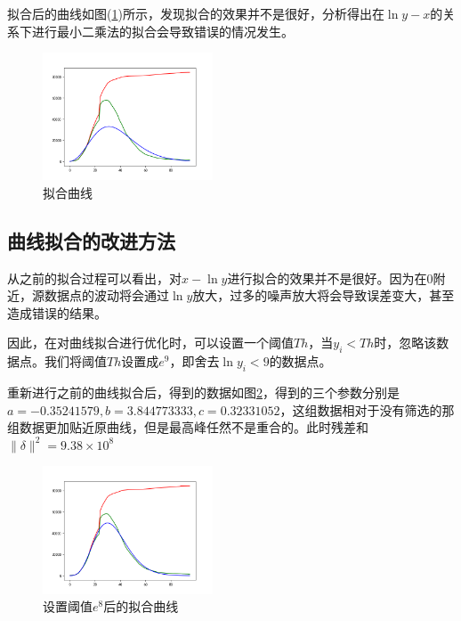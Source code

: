 \documentclass{article}
\begin{document}
\begin{multicols}{2}
                拟合后的曲线如图(\ref{plot4})所示，发现拟合的效果并不是很好，分析得出在$\ln{y}-x$的关系下进行最小二乘法的拟合会导致错误的情况发生。

                \begin{figure}[H]
                    \centering
                    \includegraphics[width=0.45\textwidth]{plot4.png}
                    \caption{拟合曲线}
                    \label{plot4}
                \end{figure}

            \subsection{曲线拟合的改进方法}
                从之前的拟合过程可以看出，对$x-\ln{y}$进行拟合的效果并不是很好。因为在$0$附近，源数据点的波动将会通过$\ln{y}$放大，过多的噪声放大将会导致误差变大，甚至造成错误的结果。

                因此，在对曲线拟合进行优化时，可以设置一个阈值$Th$，当$y_{i}<Th$时，忽略该数据点。我们将阈值$Th$设置成$e^{9}$，即舍去$\ln{y_{i}}<9$的数据点。

                重新进行之前的曲线拟合后，得到的数据如图\ref{plot5}，得到的三个参数分别是$a=-0.35241579,b=3.844773333,c=0.32331052$，这组数据相对于没有筛选的那组数据更加贴近原曲线，但是最高峰任然不是重合的。此时残差和$\parallel\delta\parallel^2=9.38{\times}10^8$

                \begin{figure}[H]
                    \centering
                    \includegraphics[width=0.45\textwidth]{plot5}
                    \caption{设置阈值$e^8$后的拟合曲线}
                    \label{plot5}
                \end{figure}


\end{multicols}
\end{document}
